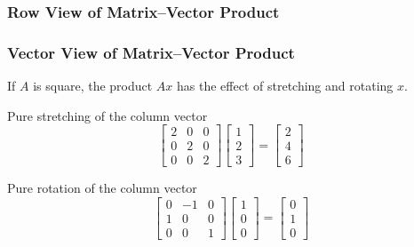 \documentclass[10pt]{beamer}
\begin{document}
\begin{frame}
\frametitle{Row View of Matrix--Vector Product}

\begin{center}
\end{center}

\end{frame}
\begin{frame}
\frametitle{Vector View of Matrix--Vector Product}

If $A$ is square, the product $Ax$ has the effect of
stretching and rotating $x$.

Pure stretching of the column vector
\begin{equation*}
    \begin{bmatrix}2 & 0 & 0\\ 0 & 2 & 0 \\ 0 & 0 & 2 \end{bmatrix}
    \begin{bmatrix}1 \\ 2 \\ 3 \end{bmatrix}
    =
    \begin{bmatrix}2 \\ 4 \\ 6 \end{bmatrix}
\end{equation*}

Pure rotation of the column vector
\begin{equation*}
    \begin{bmatrix}0 & -1 & 0\\ 1 & 0 & 0 \\ 0 & 0 & 1 \end{bmatrix}
    \begin{bmatrix}1 \\ 0 \\ 0 \end{bmatrix}
    =
    \begin{bmatrix}0 \\ 1 \\ 0 \end{bmatrix}
\end{equation*}

\end{frame}
\end{document}
